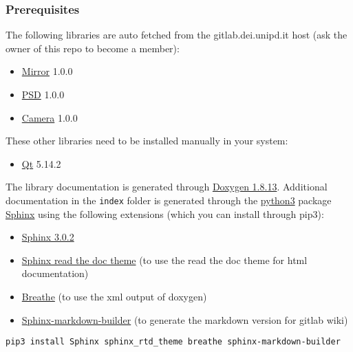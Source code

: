 \hypertarget{prerequisites}{%
\subsubsection{Prerequisites}\label{prerequisites}}

The following libraries are auto fetched from the gitlab.dei.unipd.it
host (ask the owner of this repo to become a member):

\begin{itemize}
\tightlist
\item
  \href{https://gitlab.dei.unipd.it/PAT/Mirror}{Mirror} 1.0.0
\item
  \href{https://gitlab.dei.unipd.it/PAT/PSD}{PSD} 1.0.0
\item
  \href{https://gitlab.dei.unipd.it/PAT/Camera}{Camera} 1.0.0
\end{itemize}

These other libraries need to be installed manually in your system:

\begin{itemize}
\tightlist
\item
  \href{https://www.qt.io/}{Qt} 5.14.2
\end{itemize}

The library documentation is generated through
\href{http://www.doxygen.nl/download.html}{Doxygen 1.8.13}. Additional
documentation in the \texttt{index} folder is generated through the
\href{https://www.anaconda.com/products/individual}{python3} package
\href{https://www.sphinx-doc.org/en/master/}{Sphinx} using the following
extensions (which you can install through pip3):

\begin{itemize}
\tightlist
\item
  \href{https://pypi.org/project/Sphinx/}{Sphinx 3.0.2}
\item
  \href{https://sphinx-rtd-theme.readthedocs.io/en/stable/}{Sphinx read
  the doc theme} (to use the read the doc theme for html documentation)
\item
  \href{https://pypi.org/project/breathe/}{Breathe} (to use the xml
  output of doxygen)
\item
  \href{https://pypi.org/project/sphinx-markdown-builder/}{Sphinx-markdown-builder}
  (to generate the markdown version for gitlab wiki)
\end{itemize}

\texttt{pip3\ install\ Sphinx\ sphinx\_rtd\_theme\ breathe\ sphinx-markdown-builder}

